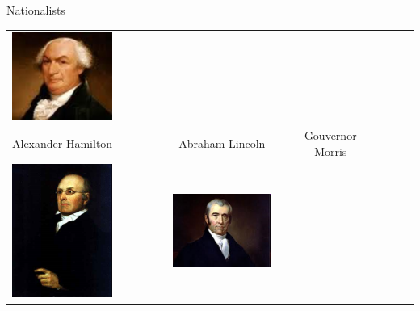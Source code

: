 \begin{frame}{Nationalists}
\begin{table}[h]
\begin{tabular}{lcccccc}
    \includegraphics[width=0.75\textwidth,height=.3\textheight,keepaspectratio=true]{img/morris-portrait.png} \\
    Alexander Hamilton & 
    Abraham Lincoln &
    Gouvernor Morris \\
    \includegraphics[width=0.75\textwidth,height=.3\textheight,keepaspectratio=true]{img/story-portrait.png} &
    \includegraphics[width=0.75\textwidth,height=.3\textheight,keepaspectratio=true]{img/marshall-portrait.png} &

\end{tabular}
\end{table}
\end{frame}
